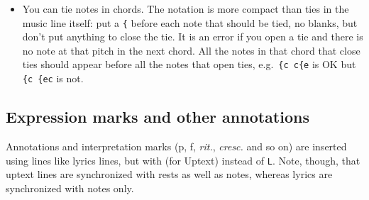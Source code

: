 \documentclass[11pt]{article}
\begin{document}
\begin{itemize}
\item You can tie notes in chords.    The notation is more compact
than ties in the music line itself: put a \verb'{' before each note that should
be tied, no blanks, but don't put anything to close the tie.  It is an error
if you open a tie and there is no note at that pitch in the next chord.
All the notes in that chord that close ties should appear before
all the notes that open ties, e.g.\ \verb"{c c{e" is OK but
\verb"{c {ec" is not.


\hskip -18mm
\begin{mus}

\end{mus}
\vskip 12pt



\end{itemize}

\subsection{Expression marks and other annotations}

Annotations and interpretation marks ({\ppff p}, {\ppff f}, \textit{rit.}, 
\textit{cresc.} and so on) are inserted using lines like lyrics lines, but 
with  (for \mark Uptext) instead of \verb'L'.   
Note, though, that uptext lines are synchronized with rests as well as
notes, whereas lyrics are synchronized with notes only.
\end{document}
